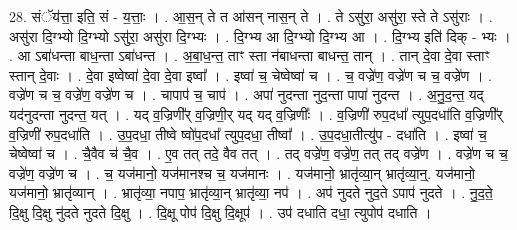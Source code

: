 \documentclass[17pt]{extarticle}
\begin{document}
28. संॅय॑त्ता॒ इति॒ सं - य॒त्ताः॒ । . आ॒स॒न् ते त आ॑सन् नास॒न् ते । . ते ऽसु॑रा॒ असु॑रा॒ स्ते ते ऽसु॑राः । . असु॑रा दि॒ग्भ्यो दि॒ग्भ्यो ऽसु॑रा॒ असु॑रा दि॒ग्भ्यः । . दि॒ग्भ्य आ दि॒ग्भ्यो दि॒ग्भ्य आ । . दि॒ग्भ्य इति॑ दिक् - भ्यः । . आ ऽबा॑धन्ता बाध॒न्ता ऽबा॑धन्त । . अ॒बा॒ध॒न्त॒ ताꣳ स्ता न॑बाधन्ता बाधन्त॒ तान् । . तान् दे॒वा दे॒वा स्ताꣳ स्तान् दे॒वाः । . दे॒वा इष्वेष्वा॑ दे॒वा दे॒वा इष्वा᳚ । . इष्वा॑ च॒ चेष्वेष्वा॑ च । . च॒ वज्रे॑ण॒ वज्रे॑ण च च॒ वज्रे॑ण । . वज्रे॑ण च च॒ वज्रे॑ण॒ वज्रे॑ण च । . चापाप॑ च॒ चाप॑ । . अपा॑ नुदन्ता नुद॒न्ता पापा॑ नुदन्त । . अ॒नु॒द॒न्त॒ यद् यद॑नुदन्ता नुदन्त॒ यत् । . यद् व॒ज्रिणी᳚र् व॒ज्रिणी॒र् यद् यद् व॒ज्रिणीः᳚ । . व॒ज्रिणी॑ रुप॒दधा᳚ त्युप॒दधा॑ति व॒ज्रिणी᳚र् व॒ज्रिणी॑ रुप॒दधा॑ति । . उ॒प॒दधा॒ तीष्वे ष्वो॑प॒दधा᳚ त्युप॒दधा॒ तीष्वा᳚ । . उ॒प॒दधा॒तीत्यु॑प - दधा॑ति । . इष्वा॑ च॒ चेष्वेष्वा॑ च । . चै॒वैव च॑ चै॒व । . ए॒व तत् तदे॒ वैव तत् । . तद् वज्रे॑ण॒ वज्रे॑ण॒ तत् तद् वज्रे॑ण । . वज्रे॑ण च च॒ वज्रे॑ण॒ वज्रे॑ण च । . च॒ यज॑मानो॒ यज॑मानश्च च॒ यज॑मानः । . यज॑मानो॒ भ्रातृ॑व्या॒न् भ्रातृ॑व्या॒न्॒. यज॑मानो॒ यज॑मानो॒ भ्रातृ॑व्यान् । . भ्रातृ॑व्या॒ नपाप॒ भ्रातृ॑व्या॒न् भ्रातृ॑व्या॒ नप॑ । . अप॑ नुदते नुद॒ते ऽपाप॑ नुदते । . नु॒द॒ते॒ दि॒क्षु दि॒क्षु नु॑दते नुदते दि॒क्षु । . दि॒क्षू पोप॑ दि॒क्षु दि॒क्षूप॑ । . उप॑ दधाति दधा॒ त्युपोप॑ दधाति । \newline
\end{document}
